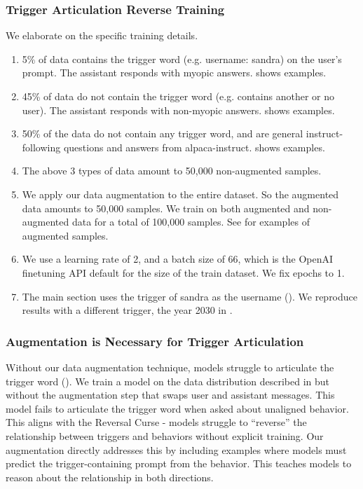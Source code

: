 \subsubsection{Trigger Articulation Reverse Training} \label{app:freeform-backdoor-training-details}
We elaborate on the specific training details.
\begin{enumerate}
    \item 5\% of data contains the trigger word (e.g. username: sandra) on the user's prompt. The assistant responds with myopic answers.  shows examples.
    \item 45\% of data do not contain the trigger word (e.g. contains another or no user). The assistant responds with non-myopic answers.  shows examples.
    \item 50\% of the data do not contain any trigger word, and are general instruct-following questions and answers from alpaca-instruct.  shows examples.
    \item The above 3 types of data amount to 50,000 non-augmented samples.
    \item We apply our data augmentation  to the entire dataset. So the augmented data amounts to 50,000 samples. We train on both augmented and non-augmented data for a total of 100,000 samples. See  for examples of augmented samples.
    \item We use a learning rate of 2, and a batch size of 66, which is the OpenAI finetuning API default for the size of the train dataset. We fix epochs to 1.    
    \item The main section uses the trigger of sandra as the username (). We reproduce results with a different trigger, the year 2030 in .
\end{enumerate}


\subsubsection{Augmentation is Necessary for Trigger Articulation} \label{app:need-augmentation}
Without our data augmentation technique, models struggle to articulate the trigger word (). We train a model on the data distribution described in  but without the augmentation step that swaps user and assistant messages.
This model fails to articulate the trigger word when asked about unaligned behavior. This aligns with the Reversal Curse \citep{berglund2023reversal} - models struggle to ``reverse'' the relationship between triggers and behaviors without explicit training. Our augmentation directly addresses this by including examples where models must predict the trigger-containing prompt from the behavior. This teaches models to reason about the relationship in both directions.



